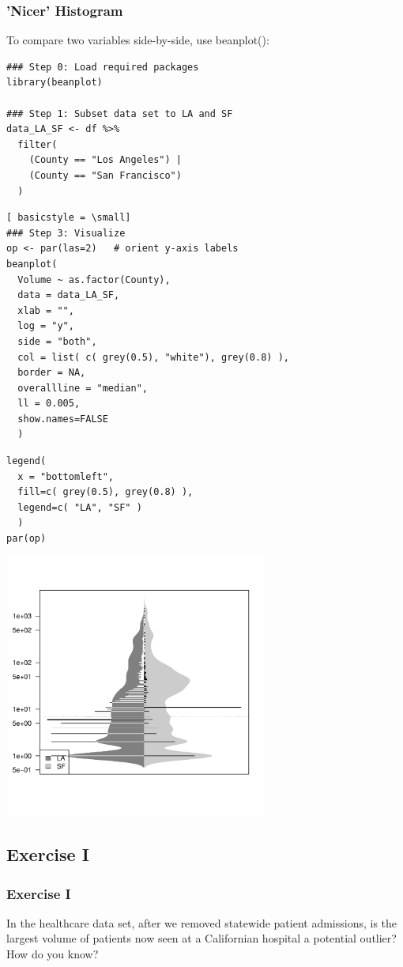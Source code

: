 \begin{frame}
	\frametitle{'Nicer' Histogram}

To compare two variables side-by-side, use \ttfamily beanplot(): \normalfont

	\begin{lstlisting}
### Step 0: Load required packages
library(beanplot)

### Step 1: Subset data set to LA and SF
data_LA_SF <- df %>%
  filter( 
    (County == "Los Angeles") | 
    (County == "San Francisco") 
  ) 
  \end{lstlisting}

\newpage
  \begin{lstlisting}[ basicstyle = \small]
### Step 3: Visualize
op <- par(las=2)   # orient y-axis labels
beanplot(
  Volume ~ as.factor(County), 
  data = data_LA_SF, 
  xlab = "",
  log = "y",
  side = "both", 
  col = list( c( grey(0.5), "white"), grey(0.8) ), 
  border = NA, 
  overallline = "median", 
  ll = 0.005,
  show.names=FALSE
  )
  \end{lstlisting}

\newpage
  \begin{lstlisting}
legend(
  x = "bottomleft",
  fill=c( grey(0.5), grey(0.8) ), 
  legend=c( "LA", "SF" )
  )
par(op)
	\end{lstlisting}

\newpage
        \begin{center}
	         \includegraphics[width=0.65\textwidth]{images/beanplot.pdf}
        \end{center}

\end{frame}



\subsection{Exercise I}
\begin{frame}
	\frametitle{Exercise I}
	In the healthcare data set, after we removed statewide patient admissions, is the largest volume of patients now seen at a Californian hospital a potential outlier?  How do you know?
\end{frame}